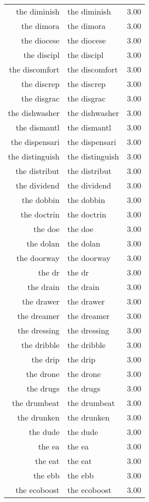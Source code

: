 \begin{table}[ht]
\begin{tabular}{rlr}
  the diminish & the diminish & 3.00 \\ 
  the dimora & the dimora & 3.00 \\ 
  the diocese & the diocese & 3.00 \\ 
  the discipl & the discipl & 3.00 \\ 
  the discomfort & the discomfort & 3.00 \\ 
  the discrep & the discrep & 3.00 \\ 
  the disgrac & the disgrac & 3.00 \\ 
  the dishwasher & the dishwasher & 3.00 \\ 
  the dismantl & the dismantl & 3.00 \\ 
  the dispensari & the dispensari & 3.00 \\ 
  the distinguish & the distinguish & 3.00 \\ 
  the distribut & the distribut & 3.00 \\ 
  the dividend & the dividend & 3.00 \\ 
  the dobbin & the dobbin & 3.00 \\ 
  the doctrin & the doctrin & 3.00 \\ 
  the doe & the doe & 3.00 \\ 
  the dolan & the dolan & 3.00 \\ 
  the doorway & the doorway & 3.00 \\ 
  the dr & the dr & 3.00 \\ 
  the drain & the drain & 3.00 \\ 
  the drawer & the drawer & 3.00 \\ 
  the dreamer & the dreamer & 3.00 \\ 
  the dressing & the dressing & 3.00 \\ 
  the dribble & the dribble & 3.00 \\ 
  the drip & the drip & 3.00 \\ 
  the drone & the drone & 3.00 \\ 
  the drugs & the drugs & 3.00 \\ 
  the drumbeat & the drumbeat & 3.00 \\ 
  the drunken & the drunken & 3.00 \\ 
  the dude & the dude & 3.00 \\ 
  the ea & the ea & 3.00 \\ 
  the eat & the eat & 3.00 \\ 
  the ebb & the ebb & 3.00 \\ 
  the ecoboost & the ecoboost & 3.00 \\ 

\end{tabular}
\end{table}
